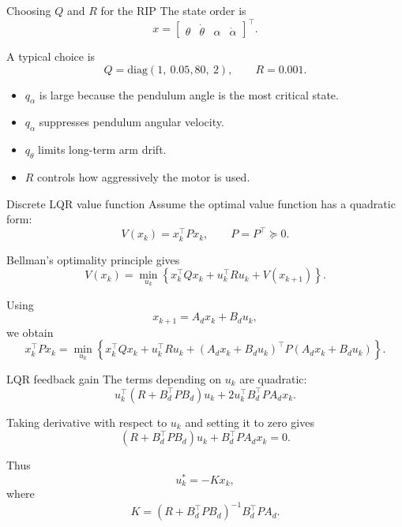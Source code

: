 \documentclass[aspectratio=169]{beamer}
\begin{document}
\begin{frame}{Choosing $Q$ and $R$ for the RIP}
The state order is
\[
x=\begin{bmatrix}\theta&\dot\theta&\alpha&\dot\alpha\end{bmatrix}^\top.
\]

A typical choice is
\[
Q=\mathrm{diag}(1,\ 0.05,
80,\ 2),
\qquad
R=0.001.
\]

\vspace{0.2cm}
\begin{itemize}
    \item $q_\alpha$ is large because the pendulum angle is the most critical state.
    \vspace{0.18cm}
    \item $q_{\dot\alpha}$ suppresses pendulum angular velocity.
    \vspace{0.18cm}
    \item $q_\theta$ limits long-term arm drift.
    \vspace{0.18cm}
    \item $R$ controls how aggressively the motor is used.
\end{itemize}
\end{frame}

\begin{frame}{Discrete LQR value function}
Assume the optimal value function has a quadratic form:
\[
V(x_k)=x_k^\top P x_k,
\qquad
P=P^\top\succeq0.
\]

Bellman's optimality principle gives
\[
V(x_k)=\min_{u_k}
\left\{
x_k^\top Qx_k+u_k^\top Ru_k+V(x_{k+1})
\right\}.
\]

\vspace{0.15cm}

Using
\[
x_{k+1}=A_dx_k+B_du_k,
\]
we obtain
\[
x_k^\top P x_k
=\min_{u_k}
\left\{
x_k^\top Qx_k+u_k^\top Ru_k
+(A_dx_k+B_du_k)^\top P(A_dx_k+B_du_k)
\right\}.
\]
\end{frame}

\begin{frame}{LQR feedback gain}
The terms depending on $u_k$ are quadratic:
\[
u_k^\top(R+B_d^\top PB_d)u_k
+2u_k^\top B_d^\top PA_dx_k.
\]

\vspace{0.2cm}

Taking derivative with respect to $u_k$ and setting it to zero gives
\[
(R+B_d^\top PB_d)u_k+B_d^\top PA_dx_k=0.
\]

\vspace{0.2cm}

Thus
\[
u_k^*=-Kx_k,
\]
where
\[
K=(R+B_d^\top PB_d)^{-1}B_d^\top PA_d.
\]
\end{frame}
\end{document}
